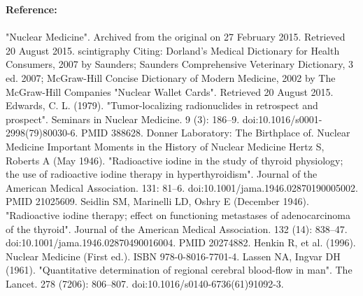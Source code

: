 \documentclass[12pt]{article}
\begin{document}
\noindent \textbf{\large Reference:} \\ \\  "Nuclear Medicine". Archived from the original on 27 February 2015. Retrieved 20 August 2015.
 scintigraphy Citing: Dorland's Medical Dictionary for Health Consumers, 2007 by Saunders; Saunders Comprehensive Veterinary Dictionary, 3 ed. 2007; McGraw-Hill Concise Dictionary of Modern Medicine, 2002 by The McGraw-Hill Companies
 "Nuclear Wallet Cards". Retrieved 20 August 2015.
 Edwards, C. L. (1979). "Tumor-localizing radionuclides in retrospect and prospect". Seminars in Nuclear Medicine. 9 (3): 186–9. doi:10.1016/s0001-2998(79)80030-6. PMID 388628.
 Donner Laboratory: The Birthplace of. Nuclear Medicine
 Important Moments in the History of Nuclear Medicine
 Hertz S, Roberts A (May 1946). "Radioactive iodine in the study of thyroid physiology; the use of radioactive iodine therapy in hyperthyroidism". Journal of the American Medical Association. 131: 81–6. doi:10.1001/jama.1946.02870190005002. PMID 21025609.
 Seidlin SM, Marinelli LD, Oshry E (December 1946). "Radioactive iodine therapy; effect on functioning metastases of adenocarcinoma of the thyroid". Journal of the American Medical Association. 132 (14): 838–47. doi:10.1001/jama.1946.02870490016004. PMID 20274882.
 Henkin R, et al. (1996). Nuclear Medicine (First ed.). ISBN 978-0-8016-7701-4.
 Lassen NA, Ingvar DH (1961). "Quantitative determination of regional cerebral blood-flow in man". The Lancet. 278 (7206): 806–807. doi:10.1016/s0140-6736(61)91092-3.


\end{document}

